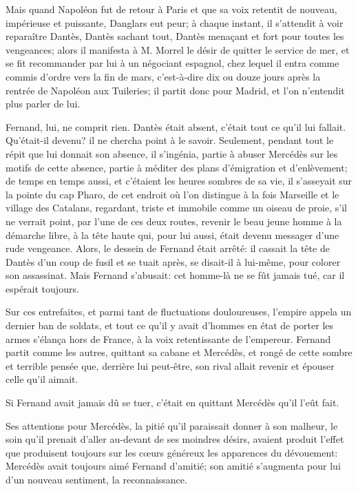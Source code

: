 Mais quand Napoléon fut de retour à Paris et que sa voix retentit de nouveau, impérieuse et puissante, Danglars eut peur; à chaque instant, il s'attendit à voir reparaître Dantès, Dantès sachant tout, Dantès menaçant et fort pour toutes les vengeances; alors il manifesta à M. Morrel le désir de quitter le service de mer, et se fit recommander par lui à un négociant espagnol, chez lequel il entra comme commis d'ordre vers la fin de mars, c'est-à-dire dix ou douze jours après la rentrée de Napoléon aux Tuileries; il partit donc pour Madrid, et l'on n'entendit plus parler de lui.

Fernand, lui, ne comprit rien. Dantès était absent, c'était tout ce qu'il lui fallait. Qu'était-il devenu? il ne chercha point à le savoir. Seulement, pendant tout le répit que lui donnait son absence, il s'ingénia, partie à abuser Mercédès sur les motifs de cette absence, partie à méditer des plans d'émigration et d'enlèvement; de temps en temps aussi, et c'étaient les heures sombres de sa vie, il s'asseyait sur la pointe du cap Pharo, de cet endroit où l'on distingue à la fois Marseille et le village des Catalans, regardant, triste et immobile comme un oiseau de proie, s'il ne verrait point, par l'une de ces deux routes, revenir le beau jeune homme à la démarche libre, à la tête haute qui, pour lui aussi, était devenu messager d'une rude vengeance. Alors, le dessein de Fernand était arrêté: il cassait la tête de Dantès d'un coup de fusil et se tuait après, se disait-il à lui-même, pour colorer son assassinat. Mais Fernand s'abusait: cet homme-là ne se fût jamais tué, car il espérait toujours.

Sur ces entrefaites, et parmi tant de fluctuations douloureuses, l'empire appela un dernier ban de soldats, et tout ce qu'il y avait d'hommes en état de porter les armes s'élança hors de France, à la voix retentissante de l'empereur. Fernand partit comme les autres, quittant sa cabane et Mercédès, et rongé de cette sombre et terrible pensée que, derrière lui peut-être, son rival allait revenir et épouser celle qu'il aimait.

Si Fernand avait jamais dû se tuer, c'était en quittant Mercédès qu'il l'eût fait.

Ses attentions pour Mercédès, la pitié qu'il paraissait donner à son malheur, le soin qu'il prenait d'aller au-devant de ses moindres désirs, avaient produit l'effet que produisent toujours sur les cœurs généreux les apparences du dévouement: Mercédès avait toujours aimé Fernand d'amitié; son amitié s'augmenta pour lui d'un nouveau sentiment, la reconnaissance.

